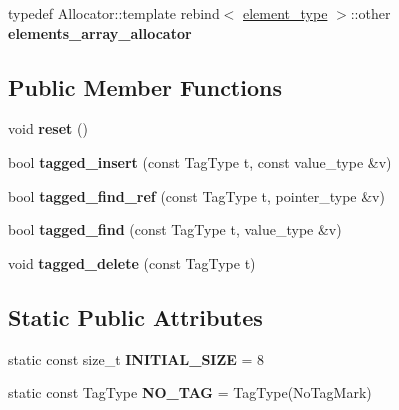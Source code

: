\begin{DoxyCompactItemize}
\item 
\hypertarget{classinternal_1_1tagged__buffer_af34bb83ebae52b287e93b216f3bebcef}{}typedef Allocator\+::template rebind$<$ \hyperlink{structinternal_1_1type__plus__align}{element\+\_\+type} $>$\+::other {\bfseries elements\+\_\+array\+\_\+allocator}\label{classinternal_1_1tagged__buffer_af34bb83ebae52b287e93b216f3bebcef}

\end{DoxyCompactItemize}
\subsection*{Public Member Functions}
\begin{DoxyCompactItemize}
\item 
\hypertarget{classinternal_1_1tagged__buffer_ae8cfb9e7783d74c26047aebdc94b7e85}{}void {\bfseries reset} ()\label{classinternal_1_1tagged__buffer_ae8cfb9e7783d74c26047aebdc94b7e85}

\item 
\hypertarget{classinternal_1_1tagged__buffer_a1f31305c8bb16e0a6c2b4510a3138df2}{}bool {\bfseries tagged\+\_\+insert} (const Tag\+Type t, const value\+\_\+type \&v)\label{classinternal_1_1tagged__buffer_a1f31305c8bb16e0a6c2b4510a3138df2}

\item 
\hypertarget{classinternal_1_1tagged__buffer_a7da4baf373d11b3910fb8ac6a8f0d027}{}bool {\bfseries tagged\+\_\+find\+\_\+ref} (const Tag\+Type t, pointer\+\_\+type \&v)\label{classinternal_1_1tagged__buffer_a7da4baf373d11b3910fb8ac6a8f0d027}

\item 
\hypertarget{classinternal_1_1tagged__buffer_a48d7999af455114cb78d20a5afb84519}{}bool {\bfseries tagged\+\_\+find} (const Tag\+Type t, value\+\_\+type \&v)\label{classinternal_1_1tagged__buffer_a48d7999af455114cb78d20a5afb84519}

\item 
\hypertarget{classinternal_1_1tagged__buffer_a739d52831d316f4b9ba6180aa5597c84}{}void {\bfseries tagged\+\_\+delete} (const Tag\+Type t)\label{classinternal_1_1tagged__buffer_a739d52831d316f4b9ba6180aa5597c84}

\end{DoxyCompactItemize}
\subsection*{Static Public Attributes}
\begin{DoxyCompactItemize}
\item 
\hypertarget{classinternal_1_1tagged__buffer_ab39678b1837ff0bf7bbae8bade073b60}{}static const size\+\_\+t {\bfseries I\+N\+I\+T\+I\+A\+L\+\_\+\+S\+I\+Z\+E} = 8\label{classinternal_1_1tagged__buffer_ab39678b1837ff0bf7bbae8bade073b60}

\item 
\hypertarget{classinternal_1_1tagged__buffer_ad857e4af765dc01cc75c9b9ed6235070}{}static const Tag\+Type {\bfseries N\+O\+\_\+\+T\+A\+G} = Tag\+Type(No\+Tag\+Mark)\label{classinternal_1_1tagged__buffer_ad857e4af765dc01cc75c9b9ed6235070}

\end{DoxyCompactItemize}


